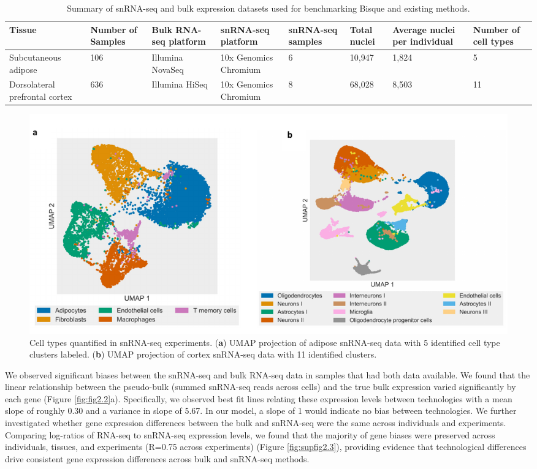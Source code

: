\begin{table}
    \scriptsize
    \centering
    \begin{tabularx}{\textwidth}{|L|L|L|L|L|p{1cm}|L|L|}
    \hline
    \textbf{Tissue} & \textbf{Number of Samples} & \textbf{Bulk RNA-seq platform} & \textbf{snRNA-seq platform} & \textbf{snRNA-seq samples} & \textbf{Total nuclei} & \textbf{Average nuclei per individual} & \textbf{Number of cell types}  \\ \hline
    Subcutaneous adipose & 106 & Illumina NovaSeq & 10x Genomics Chromium & 6 & 10,947 & 1,824 & 5  \\ \hline
    Dorsolateral prefrontal cortex & 636 & Illumina HiSeq & 10x Genomics Chromium & 8 & 68,028 & 8,503 & 11  \\
    \hline
    \end{tabularx}
    \captionsetup{justification=raggedright,singlelinecheck=false}
    \caption{
        Summary of snRNA-seq and bulk expression datasets used for benchmarking Bisque and existing methods. 
        }
    \label{table:table2.1}
\end{table}

\begin{figure}
\centering
\includegraphics[width=\textwidth]{chapter2/figures/supfig1-2.pdf} 
\caption{
         Cell types quantified in snRNA-seq experiments.
         (\textbf{a}) UMAP projection of adipose snRNA-seq data with 5 identified cell type clusters labeled. (\textbf{b}) UMAP projection of cortex snRNA-seq data with 11 identified clusters.
        }
\label{fig:supfig2.1}
\end{figure}

We observed significant biases between the snRNA-seq and bulk RNA-seq data in samples that had both data available. We found that the linear relationship between the pseudo-bulk (summed snRNA-seq reads across cells) and the true bulk expression varied significantly by each gene (Figure \ref{fig:fig2.2}a). Specifically, we observed best fit lines relating these expression levels between technologies with a mean slope of roughly 0.30 and a variance in slope of 5.67. In our model, a slope of 1 would indicate no bias between technologies. We further investigated whether gene expression differences between the bulk and snRNA-seq were the same across individuals and experiments. Comparing log-ratios of RNA-seq to snRNA-seq expression levels, we found that the majority of gene biases were preserved across individuals, tissues, and experiments (R=0.75 across experiments) (Figure \ref{fig:supfig2.3}), providing evidence that technological differences drive consistent gene expression differences across bulk and snRNA-seq methods. 


